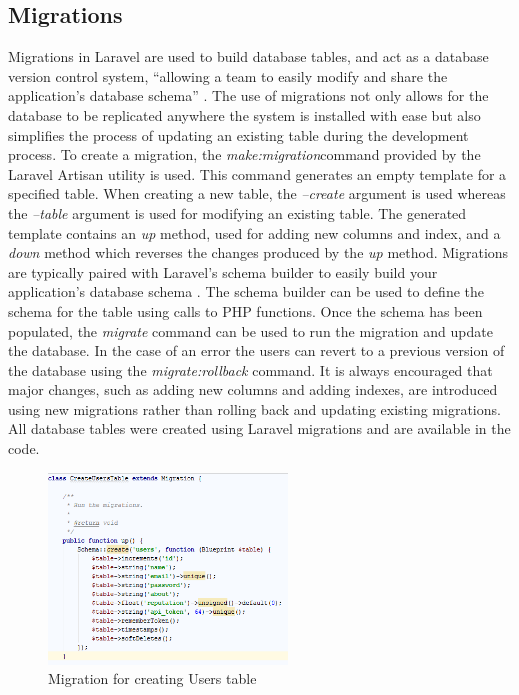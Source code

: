 \subsection{Migrations}
Migrations in Laravel are used to build database tables, and act as a database version control system, ``allowing a team to easily modify and share the application's database schema'' \cite{Laravel:Migrations}. The use of migrations not only allows for the database to be replicated anywhere the system is installed with ease but also simplifies the process of updating an existing table during the development process.  To create a migration, the \emph{make:migration}command provided by the Laravel Artisan utility is used. This command generates an empty template for a specified table. When creating a new table, the \emph{--create} argument is used whereas the \emph{--table} argument is used for modifying an existing table. The generated template contains an \emph{up} method, used for adding new columns and index, and a \emph{down} method which reverses the changes produced by the \emph{up} method. Migrations are typically paired with Laravel's schema builder to easily build your application's database schema \cite{Laravel:Migrations}. The schema builder can be used to define the schema for the table using calls to PHP functions. Once the schema has been populated, the \emph{migrate} command can be used to run the migration and update the database. In the case of an error the users can revert to a previous version of the database using the \emph{migrate:rollback} command. It is always encouraged that major changes, such as adding new columns and adding indexes, are introduced using new migrations rather than rolling back and updating existing migrations. All database tables were created using Laravel migrations and are available in the code.

\begin{figure}[H]
	\centering
	\includegraphics[height=2in]{Images/Implementation/UserMigration}
	\caption{Migration for creating Users table} \label{fig:UserMigration}
\end{figure}

